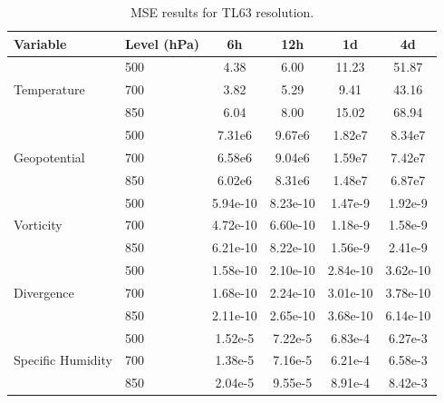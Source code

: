 \begin{table}[ht]
\centering
\small
\label{tab:MSE_63}
\begin{tabular}{llcccc}
\hline
\textbf{Variable} & \textbf{Level (hPa)} & \textbf{6h} & \textbf{12h} & \textbf{1d} & \textbf{4d} \\
\hline\hline

\multirow{3}{*}{Temperature}
    & 500 & 4.38 & 6.00 & 11.23 & 51.87 \\
    & 700 & 3.82 & 5.29 & 9.41 & 43.16 \\
    & 850 & 6.04 & 8.00 & 15.02 & 68.94 \\ 
\hline

\multirow{3}{*}{Geopotential}
    & 500 & 7.31e6 & 9.67e6 & 1.82e7 & 8.34e7 \\
    & 700 & 6.58e6 & 9.04e6 & 1.59e7 & 7.42e7 \\
    & 850 & 6.02e6 & 8.31e6 & 1.48e7 & 6.87e7 \\ 
\hline

\multirow{3}{*}{Vorticity}
    & 500 & 5.94e-10 & 8.23e-10 & 1.47e-9 & 1.92e-9 \\
    & 700 & 4.72e-10 & 6.60e-10 & 1.18e-9 & 1.58e-9 \\
    & 850 & 6.21e-10 & 8.22e-10 & 1.56e-9 & 2.41e-9 \\ 
\hline

\multirow{3}{*}{Divergence}
    & 500 & 1.58e-10 & 2.10e-10 & 2.84e-10 & 3.62e-10 \\
    & 700 & 1.68e-10 & 2.24e-10 & 3.01e-10 & 3.78e-10 \\
    & 850 & 2.11e-10 & 2.65e-10 & 3.68e-10 & 6.14e-10 \\ 
\hline

\multirow{3}{*}{Specific Humidity}
    & 500 & 1.52e-5 & 7.22e-5 & 6.83e-4 & 6.27e-3 \\
    & 700 & 1.38e-5 & 7.16e-5 & 6.21e-4 & 6.58e-3 \\
    & 850 & 2.04e-5 & 9.55e-5 & 8.91e-4 & 8.42e-3 \\ 
\hline

\end{tabular}
\caption{MSE results for TL63 resolution.}
\end{table}


